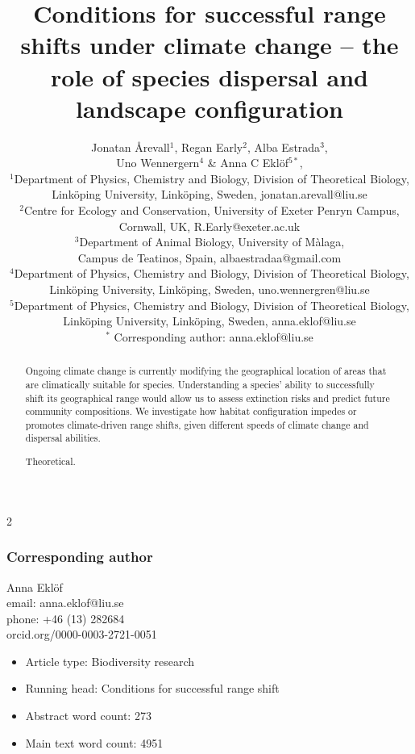 \documentclass[12pt,pdftex]{article}
\date{}
\title{Conditions for successful range shifts under climate change -- the role of species dispersal and landscape configuration}
\author{Jonatan \r{A}revall$^{1}$,  Regan Early$^{2}$, Alba Estrada$^{3}$, \\ Uno Wennergern$^{4}$ \& Anna C Ekl\"{o}f$^{5*}$,\\
 $^1$\small Department of Physics, Chemistry and Biology, Division of Theoretical Biology,\\ \small  Link\"{o}ping University, Link\"{o}ping, Sweden, jonatan.arevall@liu.se\\
 $^2$\small Centre for Ecology and Conservation, University of Exeter Penryn Campus,\\ \small Cornwall, UK, R.Early@exeter.ac.uk\\
 $^3$\small Department of Animal Biology, University of M\`{a}laga,\\ \small Campus de Teatinos, Spain, albaestradaa@gmail.com \\
 $^4$\small Department of Physics, Chemistry and Biology, Division of Theoretical Biology,\\ \small  Link\"{o}ping University, Link\"{o}ping, Sweden, uno.wennergren@liu.se\\
 $^5$\small Department of Physics, Chemistry and Biology, Division of Theoretical Biology,\\ \small  Link\"{o}ping University, Link\"{o}ping, Sweden, anna.eklof@liu.se\\
  $^*$ \small Corresponding author: anna.eklof@liu.se\\
}
\begin{document}
\linenumbers
\maketitle
\baselineskip 18pt
\begin{spacing}{2}

\subsubsection*{Corresponding author}
Anna Ekl\"{o}f\\
email: anna.eklof@liu.se\\
phone: +46 (13) 282684\\
orcid.org/0000-0003-2721-0051\\


%

\clearpage

\begin{itemize}
\item Article type: Biodiversity research
\item Running head: Conditions for successful range shift
\item Abstract word count: 273
\item Main text word count: 4951 %
\end{itemize}

\clearpage


\begin{abstract}
 Ongoing climate change is currently modifying the geographical location of areas that are climatically suitable for species. Understanding a species' ability to successfully shift its geographical range would allow us to assess extinction risks and predict future community compositions. We investigate how habitat configuration impedes or promotes climate-driven range shifts, given different speeds of climate change and dispersal abilities.

Theoretical.


\end{abstract}
\end{spacing}
\end{document}
